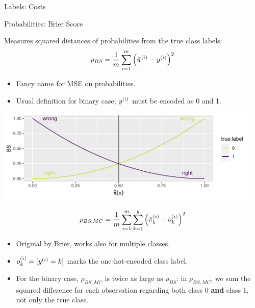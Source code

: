 \begin{vbframe}{Labels: Costs}
\begin{itemize}
  
  \end{itemize}
 
 
\end{vbframe}


\begin{vbframe}{Probabilities: Brier Score}

Measures squared distances of probabilities from the true class labels:
$$\rho_{BS} = \frac{1}{m} \sum_{i = 1}^m 
\left( \hat \pi^{(i)} - y^{(i)} \right)^2$$

\begin{itemize}
  \item Fancy name for MSE on probabilities.
  \item Usual definition for binary case; $y^{(i)}$ must be encoded as 0 and 1.
\end{itemize}

\lz

\begin{knitrout}\scriptsize
{}\color{fgcolor}

{\centering \includegraphics[width=0.95\textwidth]{figure/eval_mclass_1} 

}

\end{knitrout}


\framebreak

$$\rho_{BS, MC} = \frac{1}{m} \sum_{i = 1}^m \sum\limits_{k=1}^g
\left( \hat \pi_k^{(i)} - o_k^{(i)} \right)^2$$
\begin{itemize}
  \item Original by Brier, works also for multiple classes.
  \item $ o_k^{(i)} = [ y^{(i)} = k ] $ marks the one-hot-encoded class label.
  \item For the binary case, $\rho_{BS, MC}$ is twice as large 
  as $\rho_{BS}$: in $\rho_{BS, MC}$, we sum 
  the squared difference for each observation regarding both class 0 
  \textbf{and} class 1, not only the true class.
\end{itemize}

\end{vbframe}

